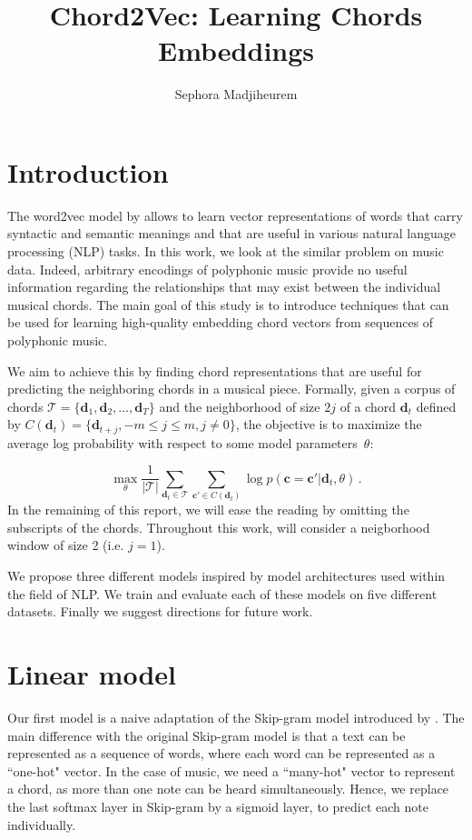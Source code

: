 \documentclass[12pt]{article}\pagestyle{myheadings}
\title{Chord2Vec: Learning Chords Embeddings}
\author{Sephora Madjiheurem}
\newcommand{\T}{\mathcal{T}}
\newcommand{\boldc}{\boldsymbol c}
\newcommand{\boldd}{\boldsymbol d}
\begin{document}
\maketitle

\section{Introduction}

The word2vec model by \citet{mik2013} allows to learn vector representations of words that carry syntactic and semantic meanings and that are useful in various natural language processing (NLP) tasks. In this work, we look at the similar problem on music data. Indeed, arbitrary encodings of polyphonic music provide no useful information regarding the relationships that may exist between the individual musical chords. The main goal of this study is to introduce techniques that can be used for learning high-quality embedding chord vectors from sequences of polyphonic music. 

We aim to achieve this by finding chord representations that are useful for predicting the neighboring chords in a musical piece. Formally, given a corpus of chords  $\T = \{\boldd_1, \boldd_2, \ldots, \boldd_T\}$ and the neighborhood of size $2j$ of a chord $\boldd_t$ defined by $ C(\boldd_t) = \{\boldd_{t+j}, -m \leq j \leq m , j \neq 0\}$, the objective is to maximize the average log probability with respect to some model parameters~$\theta$: 

\begin{equation}
\max_{\theta} \frac{1}{|\T|}\sum_{\boldd_t \in \T} \sum_{\boldc' \in C(\boldd_t)} \log p(\boldc = \boldc'|\boldd_t, \theta)
 \,.
\label{eq:c2v_obj}
\end{equation} 
In the remaining of this report, we will ease the reading by omitting the subscripts of the chords. Throughout this work, will consider a neigborhood window of size 2 (i.e. $j=1$).

We propose three different models inspired by model architectures used within the field of NLP. We train and evaluate each of these models on five different datasets. Finally we suggest directions for future work. 

\section*{Linear model}
Our first model is a naive adaptation of the Skip-gram model introduced by \citet{mik2013}. The main difference with the original Skip-gram model is that a text can be represented as a sequence of words, where each word can be represented as a ``one-hot" vector. In the case of music, we need a  ``many-hot" vector to represent a chord, as more than one note can be heard simultaneously. Hence, we replace the last softmax layer in Skip-gram by a sigmoid layer, to predict each note individually.  
\end{document}
